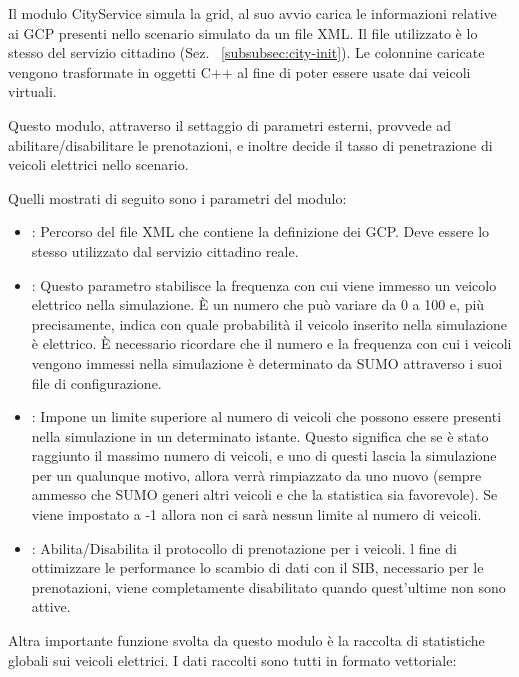 Il modulo CityService simula la grid, al suo avvio carica le informazioni relative ai GCP presenti nello scenario simulato da un file XML. Il file utilizzato è lo stesso del servizio cittadino (Sez. ~\ref{subsubsec:city-init}). Le colonnine caricate vengono trasformate in oggetti C++ al fine di poter essere usate dai veicoli virtuali. 

Questo modulo, attraverso il settaggio di parametri esterni, provvede ad abilitare/disabilitare le prenotazioni, e inoltre decide il tasso di penetrazione di veicoli elettrici nello scenario.

Quelli mostrati di seguito sono i parametri del modulo:

\begin{itemize}
	\item {}: Percorso del file XML che contiene la definizione dei GCP. Deve essere lo stesso utilizzato dal servizio cittadino reale.
	\item {}: Questo parametro stabilisce la frequenza con cui viene immesso un veicolo elettrico nella simulazione. È un numero che può variare da 0 a 100 e, più precisamente, indica con quale probabilità il veicolo inserito nella simulazione è elettrico. È necessario ricordare che il numero e la frequenza con cui i veicoli vengono immessi nella simulazione è determinato da SUMO attraverso i suoi file di configurazione. 
	\item {}: Impone un limite superiore al numero di veicoli che possono essere presenti nella simulazione in un determinato istante. Questo significa che se è stato raggiunto il massimo numero di veicoli, e uno di questi lascia la simulazione per un qualunque motivo, allora verrà rimpiazzato da uno nuovo (sempre ammesso che SUMO generi altri veicoli e che la statistica sia favorevole). Se viene impostato a -1 allora non ci sarà nessun limite al numero di veicoli.
	\item {}: Abilita/Disabilita il protocollo di prenotazione per i veicoli. l fine di ottimizzare le performance lo scambio di dati con il SIB, necessario per le prenotazioni, viene completamente disabilitato quando quest'ultime non sono attive.
\end{itemize}

Altra importante funzione svolta da questo modulo è la raccolta di statistiche globali sui veicoli elettrici. I dati raccolti sono tutti in formato vettoriale:


